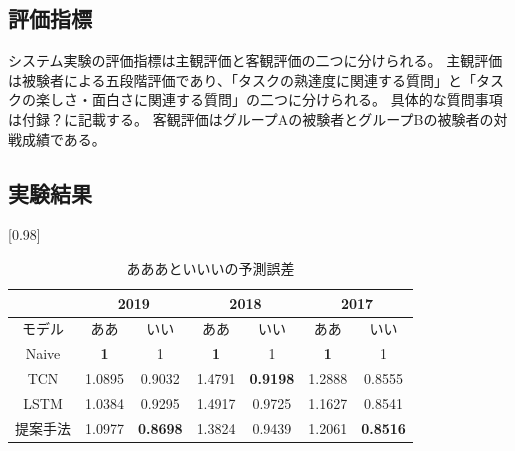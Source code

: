 \subsection{評価指標}
システム実験の評価指標は主観評価と客観評価の二つに分けられる。
主観評価は被験者による五段階評価であり、「タスクの熟達度に関連する質問」と「タスクの楽しさ・面白さに関連する質問」の二つに分けられる。
具体的な質問事項は付録？に記載する。
客観評価はグループAの被験者とグループBの被験者の対戦成績である。

\subsection{実験結果}

\begin{table}[H]
	\caption{あああといいいの予測誤差}
	\centering
	\scalebox{0.98}[0.98]{
		\begin{tabular}{c|c|c|c|c|c|c}
			\multicolumn{1}{c}{} & \multicolumn{2}{|c|}{2019} 
			& \multicolumn{2}{c|}{2018} & \multicolumn{2}{c}{2017}\\ \hline \hline
			モデル    & ああ & いい & ああ & いい & ああ & いい \\ \hline
			Naive    & \bf{1} & 1 & \bf{1} & 1 & \bf{1} & 1 \\
			TCN      & 1.0895 & 0.9032 & 1.4791 & \bf{0.9198} & 1.2888 & 0.8555 \\
			LSTM     & 1.0384 & 0.9295 & 1.4917 & 0.9725 & 1.1627 & 0.8541 \\
			提案手法  & 1.0977 & \bf{0.8698} & 1.3824 & 0.9439 & 1.2061 & \bf{0.8516} \\
		\end{tabular}
	}
	\label{table:result-2}
\end{table}
